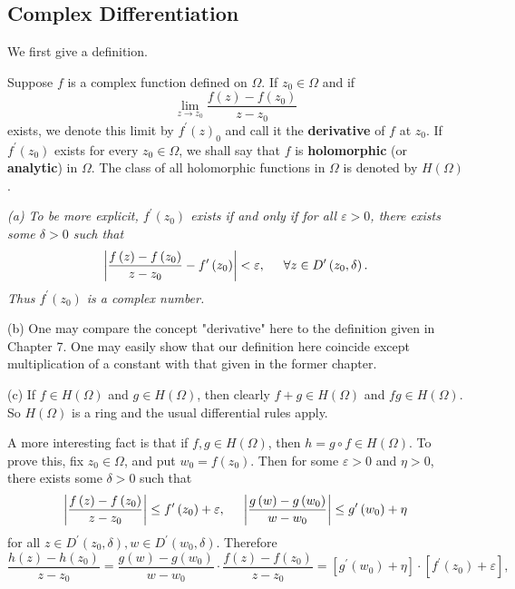\subsection{Complex Differentiation}
We first give a definition.
\begin{definition}
Suppose $f$ is a complex function defined on $\Omega$. If $z_0\in\Omega$ and if 
$$\lim_{z\to z_0}\frac{f(z)-f(z_0)}{z-z_0}$$
exists, we denote this limit by $f^\prime(z)_0$ and call it the \textbf{derivative} of $f$ at $z_0$. If $f^\prime(z_0)$ exists for every $z_0\in\Omega$, we shall say that $f$ is \textbf{holomorphic} (or \textbf{analytic}) in $\Omega$. The class of all holomorphic functions in $\Omega$ is denoted by $H(\Omega)$.
\end{definition}
\begin{note}\em
(a) To be more explicit, $f^\prime(z_0)$ exists if and only if for all $\varepsilon>0$, there exists some $\delta>0$ such that 
$$
\left| \frac{f\left( z \right) -f\left( z_0 \right)}{z-z_0}-f^{\prime}\left( z_0 \right) \right|<\varepsilon ,\hspace{0.5cm}\forall z\in D^{\prime}\left( z_0,\delta \right) .
$$
Thus $f^\prime(z_0)$ is a complex number.\par
(b) One may compare the concept "derivative" here to the definition given in Chapter 7. One may easily show that our definition here coincide except multiplication of a constant with that given in the former chapter.\par
(c) If $f\in H(\Omega)$ and $g\in H(\Omega)$, then clearly $f+g\in H(\Omega)$ and $fg\in H(\Omega)$. So $H(\Omega)$ is a ring and the usual differential rules apply.
\end{note}
A more interesting fact is that if $f,g\in H(\Omega)$, then $h=g\circ f\in H(\Omega)$. To prove this, fix $z_0\in\Omega$, and put $w_0=f(z_0)$. Then for some $\varepsilon>0$ and $\eta>0$, there exists some $\delta>0$ such that 
$$
\left| \frac{f\left( z \right) -f\left( z_0 \right)}{z-z_0} \right|\le f^{\prime}\left( z_0 \right) +\varepsilon ,\hspace{0.5cm}\left| \frac{g\left( w \right) -g\left( w_0 \right)}{w-w_0} \right|\le g^{\prime}\left( w_0 \right) +\eta
$$
for all $z\in D^{\prime}\left( z_0,\delta \right) ,w\in D^{\prime}\left( w_0,\delta \right) $. Therefore 
$$
\frac{h\left( z \right) -h\left( z_0 \right)}{z-z_0}=\frac{g\left( w \right) -g\left( w_0 \right)}{w-w_0}\cdot \frac{f\left( z \right) -f\left( z_0 \right)}{z-z_0}=\left[ g^{\prime}\left( w_0 \right) +\eta \right] \cdot \left[ f^{\prime}\left( z_0 \right) +\varepsilon \right] ,
$$
